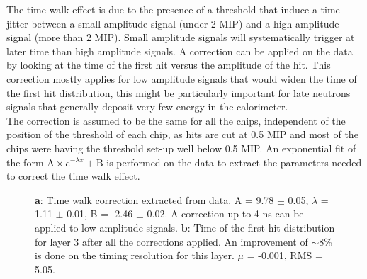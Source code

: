 \documentclass[twoside,a4paper,11pt]{article}
\begin{document}
The time-walk effect is due to the presence of a threshold that induce a time jitter between a small amplitude signal (under 2 MIP) and a high amplitude signal (more than 2 MIP). Small amplitude signals will systematically trigger at later time than high amplitude signals. %
A correction can be applied on the data by looking at the time of the first hit versus the amplitude of the hit. This correction mostly applies for low amplitude signals that would widen the time of the first hit distribution, this might be particularly important for late neutrons signals that generally deposit very few energy in the calorimeter.\\
The correction is assumed to be the same for all the chips, independent of the position of the threshold of each chip, as hits are cut at 0.5 MIP and most of the chips were having the threshold set-up well below 0.5 MIP. An exponential fit of the form $\text{A} \times e^{-\lambda{}x} + \text{B}$ is performed on the data to extract the parameters needed to correct the time walk effect.
\begin{figure}[htbp]
	\hfill
	\caption[]{\textbf{a}: Time walk correction extracted from data. A = 9.78 $\pm$ 0.05, $\lambda$ = 1.11 $\pm$ 0.01, B = -2.46 $\pm$ 0.02. A correction up to 4 ns can be applied to low amplitude signals. \textbf{b}: Time of the first hit distribution for layer 3 after all the corrections applied. An improvement of $\sim$8\% is done on the timing resolution for this layer. $\mu$ = -0.001, RMS = 5.05.}
\end{figure}
\end{document}
